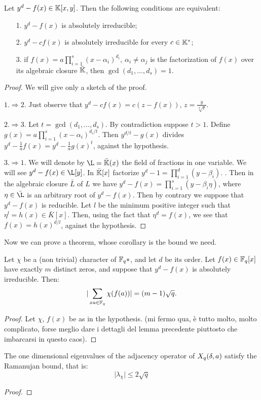 \begin{lemma}
	Let $y^d-f(x)\in {\mathbb K}[x,y]$. Then the following conditions are equivalent:
	\begin{itemize}
	\item[1.] $y^d-f(x)$ is absolutely irreducible;
	\item[2.] $y^d-cf(x)$ is absolutely irreducible for every $c \in {\mathbb K}^{*}$;
	\item[3.] if $f(x)=a \prod_{i=1}^s (x-\alpha_i)^{d_i}, \, \alpha_i \neq \alpha_j$ is the factorization of $f(x)$ over
	 its algebraic closure $\bar{{\mathbb K}}$, then $\gcd(d_1,\dots ,d_s)=1$.
	\end{itemize}
\begin{proof} We will give only a sketch of the proof.

$1. \Rightarrow 2.$ Just observe that $y^d-cf(x)=c(z-f(x)),\, z=\frac{y}{\sqrt[d]{c}}$.

$2. \Rightarrow 3.$ Let $t=\gcd(d_1,\dots ,d_s)$. By contradiction suppose $t > 1$.
Define $g(x)=a \prod_{i=1}^s (x-\alpha_i)^{d_i/t}$. Then $y^{d/t}-g(x)$ divides $y^d-\frac{1}{a}f(x)=y^d-\frac{1}{a}g(x)^t$,
against the hypothesis.

$3. \Rightarrow 1.$ We will denote by $\L=\bar{\K}(x)$ the field of fractions in one variable.
We will see $y^d-f(x) \in \L[y]$.
In $\bar{{\mathbb K}}[x]$ factorize $y^d-1=\prod_{i=1}^d (y-\beta_i)$.  .
Then in the algebraic closure $\bar{L}$ of $L$ we have $y^d-f(x)=\prod_{i=1}^{s}(y-\beta_i \eta)$,
where $\eta \in \bar{\L}$ is an arbitrary root of $y^d-f(x)$.
Then by contrary we suppose that $y^d-f(x)$ is reducible. Let $l$ be the minimum positive integer such that
$\eta^l=h(x)\in \bar{K}[x]$. Then, using the fact that $\eta^d=f(x)$, we see that $f(x)=h(x)^{d/l}$, against the hypothesis. 
\end{proof}
\end{lemma}
Now we can prove a theorem, whose corollary is the bound we need.
\begin{theorem}
Let $\chi$ be a (non trivial) character of ${\mathbb F}_q{*}$, and let $d$ be its order. Let $f(x) \in {\mathbb F}_q[x]$ have exactly
$m$ distinct zeros, and suppose that $y^d-f(x)$ is absolutely irreducible. Then:
\begin{equation}
	\vert \sum_{xa \in {\mathbb F}_q} \chi (f(a)) \vert=(m-1)\sqrt{q}. 
\end{equation}
\begin{proof}
Let $\chi$, $f(x)$ be as in the hypothesis. (mi fermo qua, è tutto molto, molto complicato, forse meglio dare i dettagli del lemma precedente piuttosto che imbarcarsi in questo caos).
\end{proof}
\end{theorem}

\begin{cor}
	The one dimensional eigenvalues of the adjacency operator of $X_q (\delta ,a)$ satisfy the Ramanujan bound, that is:
\begin{equation*}
	\vert \lambda_{\chi} \vert \le 2\sqrt{q}
\end{equation*}
\begin{proof}
	
\end{proof}
\end{cor}